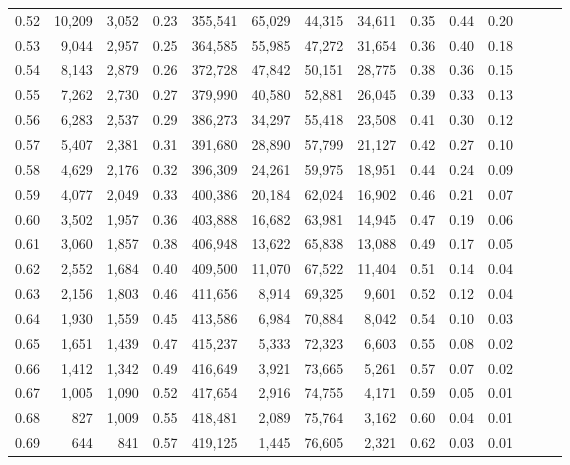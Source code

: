 \begin{tabular}{rrrrrrrrrrrrrr}
0.52 &  10,209 &  3,052 &  0.23 &  355,541 &   65,029 &  44,315 &  34,611 &  0.35 &  0.44 &      0.20 \\
0.53 &   9,044 &  2,957 &  0.25 &  364,585 &   55,985 &  47,272 &  31,654 &  0.36 &  0.40 &      0.18 \\
0.54 &   8,143 &  2,879 &  0.26 &  372,728 &   47,842 &  50,151 &  28,775 &  0.38 &  0.36 &      0.15 \\
0.55 &   7,262 &  2,730 &  0.27 &  379,990 &   40,580 &  52,881 &  26,045 &  0.39 &  0.33 &      0.13 \\
0.56 &   6,283 &  2,537 &  0.29 &  386,273 &   34,297 &  55,418 &  23,508 &  0.41 &  0.30 &      0.12 \\
0.57 &   5,407 &  2,381 &  0.31 &  391,680 &   28,890 &  57,799 &  21,127 &  0.42 &  0.27 &      0.10 \\
0.58 &   4,629 &  2,176 &  0.32 &  396,309 &   24,261 &  59,975 &  18,951 &  0.44 &  0.24 &      0.09 \\
0.59 &   4,077 &  2,049 &  0.33 &  400,386 &   20,184 &  62,024 &  16,902 &  0.46 &  0.21 &      0.07 \\
0.60 &   3,502 &  1,957 &  0.36 &  403,888 &   16,682 &  63,981 &  14,945 &  0.47 &  0.19 &      0.06 \\
0.61 &   3,060 &  1,857 &  0.38 &  406,948 &   13,622 &  65,838 &  13,088 &  0.49 &  0.17 &      0.05 \\
0.62 &   2,552 &  1,684 &  0.40 &  409,500 &   11,070 &  67,522 &  11,404 &  0.51 &  0.14 &      0.04 \\
0.63 &   2,156 &  1,803 &  0.46 &  411,656 &    8,914 &  69,325 &   9,601 &  0.52 &  0.12 &      0.04 \\
0.64 &   1,930 &  1,559 &  0.45 &  413,586 &    6,984 &  70,884 &   8,042 &  0.54 &  0.10 &      0.03 \\
0.65 &   1,651 &  1,439 &  0.47 &  415,237 &    5,333 &  72,323 &   6,603 &  0.55 &  0.08 &      0.02 \\
0.66 &   1,412 &  1,342 &  0.49 &  416,649 &    3,921 &  73,665 &   5,261 &  0.57 &  0.07 &      0.02 \\
0.67 &   1,005 &  1,090 &  0.52 &  417,654 &    2,916 &  74,755 &   4,171 &  0.59 &  0.05 &      0.01 \\
0.68 &     827 &  1,009 &  0.55 &  418,481 &    2,089 &  75,764 &   3,162 &  0.60 &  0.04 &      0.01 \\
0.69 &     644 &    841 &  0.57 &  419,125 &    1,445 &  76,605 &   2,321 &  0.62 &  0.03 &      0.01 \\

\end{tabular}
